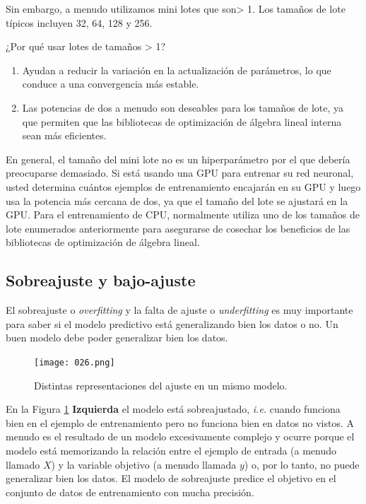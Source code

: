 \documentclass[14.5pt,a4paper]{article}
\begin{document}
Sin embargo, a menudo utilizamos mini lotes que son> 1. Los tamaños de lote típicos incluyen 32, 64, 128 y 256.

¿Por qué usar lotes de tamaños > 1? 
\begin{enumerate}
\item Ayudan a reducir la variación en la actualización de parámetros, lo que conduce a una convergencia más estable. 
\item Las potencias de dos a menudo son deseables para los tamaños de lote, ya que permiten que las bibliotecas de optimización de álgebra lineal interna sean más eficientes.
\end{enumerate}
En general, el tamaño del mini lote no es un hiperparámetro por el que debería preocuparse demasiado. Si está usando una GPU para entrenar su red neuronal, usted determina cuántos ejemplos de entrenamiento encajarán en su GPU y luego usa la potencia más cercana de dos, ya que el tamaño del lote se ajustará en la GPU. Para el entrenamiento de CPU, normalmente utiliza uno de los tamaños de lote enumerados anteriormente para asegurarse de cosechar los beneficios de las bibliotecas de optimización de álgebra lineal.

\subsection{Sobreajuste y bajo-ajuste}
El sobreajuste o \textit{overfitting} y la falta de ajuste o \textit{underfitting} \cite{quora} es muy importante para saber si el modelo predictivo está generalizando bien los datos o no. Un buen modelo debe poder generalizar bien los datos.

\begin{figure}[H]
	\begin{center}				
	\texttt{[image: 026.png]}
  	\caption{Distintas representaciones del ajuste en un mismo modelo.}
  	\label{fig:fitting}
  	\end{center}
\end{figure}

En la Figura \ref{fig:fitting} \textbf{Izquierda} el modelo está sobreajustado, \textit{i.e.} cuando funciona bien en el ejemplo de entrenamiento pero no funciona bien en datos no vistos. A menudo es el resultado de un modelo excesivamente complejo y ocurre porque el modelo está memorizando la relación entre el ejemplo de entrada (a menudo llamado $X$) y la variable objetivo (a menudo llamada $y$) o, por lo tanto, no puede generalizar bien los datos. El modelo de sobreajuste predice el objetivo en el conjunto de datos de entrenamiento con mucha precisión.
\end{document}
